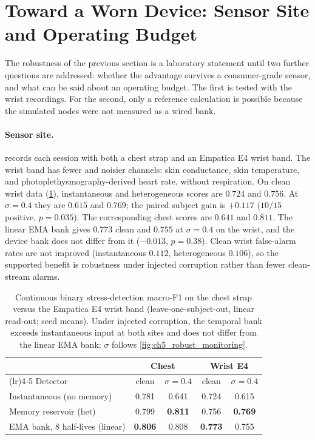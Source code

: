\documentclass[12pt, twoside]{report}
\begin{document}
\section{Toward a Worn Device: Sensor Site and Operating Budget}\label{sec:ch5_deploy}

The robustness of the previous section is a laboratory statement until two further questions are addressed: whether the advantage survives a consumer-grade sensor, and what can be said about an operating budget. The first is tested with the \WESAD{} wrist recordings. For the second, only a reference calculation is possible because the simulated \PEO{} nodes were not measured as a wired bank.

\paragraph{Sensor site.} \WESAD{} records each session with both a chest strap and an Empatica E4 wrist band. The wrist band has fewer and noisier channels: skin conductance, skin temperature, and photoplethysmography-derived heart rate, without respiration. On clean wrist data (\cref{tab:ch5_wrist}), instantaneous and heterogeneous scores are $0.724$ and $0.756$. At $\sigma=0.4$ they are $0.615$ and $0.769$; the paired subject gain is $+0.117$ ($10/15$ positive, $p=0.035$). The corresponding chest scores are $0.641$ and $0.811$. The linear EMA bank gives $0.773$ clean and $0.755$ at $\sigma=0.4$ on the wrist, and the device bank does not differ from it ($-0.013$, $p=0.38$). Clean wrist false-alarm rates are not improved (instantaneous $0.112$, heterogeneous $0.106$), so the supported benefit is robustness under injected corruption rather than fewer clean-stream alarms.

\begin{table}[t]
  \centering
  \small
  \caption[Stress detection: chest versus consumer wrist sensor]{Continuous binary stress-detection macro-F1 on the \WESAD{} chest strap versus the Empatica E4 wrist band (leave-one-subject-out, linear read-out; seed means). Under injected corruption, the temporal bank exceeds instantaneous input at both sites and does not differ from the linear EMA bank; $\sigma$ follows \cref{fig:ch5_robust_monitoring}.}
  \label{tab:ch5_wrist}
  \setlength{\tabcolsep}{5pt}
  \begin{tabularx}{\linewidth}{@{}>{\raggedright\arraybackslash}Xcccc@{}}
    \toprule
    & \multicolumn{2}{c}{Chest} & \multicolumn{2}{c}{Wrist E4} \\
    \cmidrule(lr){2-3}\cmidrule(lr){4-5}
    Detector & clean & $\sigma=0.4$ & clean & $\sigma=0.4$ \\
    \midrule
    Instantaneous (no memory)   & 0.781 & 0.641 & 0.724 & 0.615 \\
    Memory reservoir (het)      & 0.799 & \textbf{0.811} & 0.756 & \textbf{0.769} \\
    EMA bank, 8 half-lives (linear) & \textbf{0.806} & 0.808 & \textbf{0.773} & 0.755 \\
    \bottomrule
  \end{tabularx}
\end{table}
\end{document}
